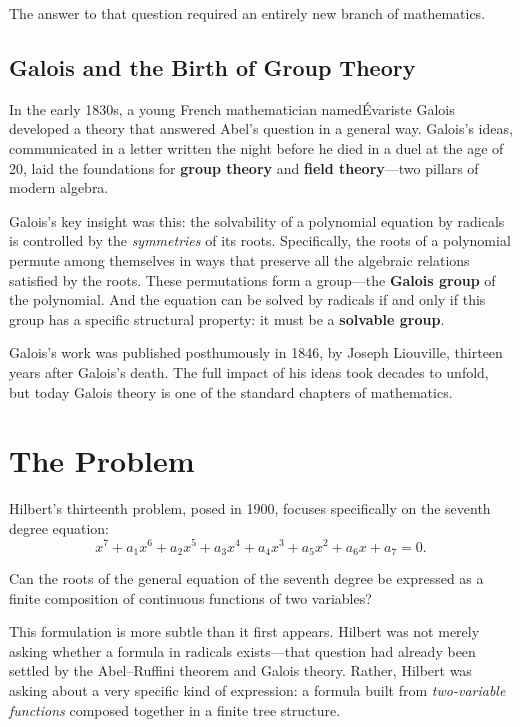 The answer to that question required an entirely new branch of mathematics.

\subsection{Galois and the Birth of Group Theory}

In the early 1830s, a young French mathematician named\'{E}variste Galois developed a theory that answered Abel's question in a general way. Galois's ideas, communicated in a letter written the night before he died in a duel at the age of 20, laid the foundations for \textbf{group theory} and \textbf{field theory}---two pillars of modern algebra.

Galois's key insight was this: the solvability of a polynomial equation by radicals is controlled by the \emph{symmetries} of its roots. Specifically, the roots of a polynomial permute among themselves in ways that preserve all the algebraic relations satisfied by the roots. These permutations form a group---the \textbf{Galois group} of the polynomial. And the equation can be solved by radicals if and only if this group has a specific structural property: it must be a \textbf{solvable group}.

Galois's work was published posthumously in 1846, by Joseph Liouville, thirteen years after Galois's death. The full impact of his ideas took decades to unfold, but today Galois theory is one of the standard chapters of mathematics.

\section{The Problem}

Hilbert's thirteenth problem, posed in 1900, focuses specifically on the seventh degree equation:
\[
    x^7 + a_1 x^6 + a_2 x^5 + a_3 x^4 + a_4 x^3 + a_5 x^2 + a_6 x + a_7 = 0.
\]

\begin{problem_statement}
Can the roots of the general equation of the seventh degree be expressed as a finite composition of continuous functions of two variables?
\end{problem_statement}

This formulation is more subtle than it first appears. Hilbert was not merely asking whether a formula in radicals exists---that question had already been settled by the Abel--Ruffini theorem and Galois theory. Rather, Hilbert was asking about a very specific kind of expression: a formula built from \emph{two-variable functions} composed together in a finite tree structure.

